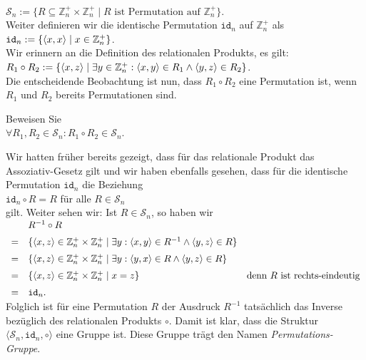 \\[0.2cm]
\hspace*{1.3cm}
$\mathcal{S}_n := \{ R \subseteq \mathbb{Z}_n^+ \times \mathbb{Z}_n^+ \mid \mbox{$R$ ist Permutation auf $\mathbb{Z}_n^+$} \}$.
\\[0.2cm]
Weiter definieren wir die identische Permutation $\mathtt{id}_n$ auf $\mathbb{Z}_n^+$ als
\\[0.2cm]
\hspace*{1.3cm}
$\mathtt{id}_n := \{ \pair(x,x) \mid x \in \mathbb{Z}_n^+ \}$.
\\[0.2cm]
Wir erinnern an die Definition des relationalen Produkts, es gilt:
\\[0.2cm]
\hspace*{1.3cm}
$R_1 \circ R_2 := \{ \pair(x,z) \mid \exists y \in \mathbb{Z}_n^+: \pair(x,y) \in R_1 \wedge \pair(y,z) \in R_2 \}$.
\\[0.2cm]
Die entscheidende Beobachtung ist nun, dass $R_1 \circ R_2$ eine Permutation ist, wenn $R_1$ und $R_2$
bereits Permutationen sind.

\exercise
Beweisen Sie
\\[0.2cm]
\hspace*{1.3cm}
$\forall R_1, R_2 \in \mathcal{S}_n: R_1 \circ R_2 \in \mathcal{S}_n$.
\exend


\remark
Wir hatten fr\"{u}her bereits gezeigt, dass f\"{u}r das relationale Produkt das Assoziativ-Gesetz gilt und wir
haben ebenfalls gesehen, dass f\"{u}r die identische Permutation $\mathtt{id}_n$ die Beziehung
\\[0.2cm]
\hspace*{1.3cm}
$\mathtt{id}_n \circ R = R$ \quad f\"{u}r alle $R \in \mathcal{S}_n$
\\[0.2cm]
gilt.  Weiter sehen wir: Ist $R \in \mathcal{S}_n$, so haben wir
\\[0.2cm]
\hspace*{1.3cm}
$
\begin{array}[t]{cll}
   & R^{-1} \circ R \\[0.2cm]
 = & \{ \pair(x,z) \in \mathbb{Z}_n^+\times \mathbb{Z}_n^+ \mid \exists y: 
        \pair(x,y) \in R^{-1} \wedge \pair(y,z) \in R 
     \} \\[0.2cm]
 = & \{ \pair(x,z) \in \mathbb{Z}_n^+ \times \mathbb{Z}_n^+ \mid 
        \exists y: \pair(y,x) \in R \wedge \pair(y,z) \in R 
     \} 
   & \\[0.2cm]
 = & \{ \pair(x,z) \in \mathbb{Z}_n^+ \times \mathbb{Z}_n^+ \mid x = z \}
    & \mbox{denn $R$ ist rechts-eindeutig}    \\[0.2cm]
 = & \mathtt{id}_n.
\end{array}
$
\\[0.2cm]
Folglich ist f\"{u}r eine Permutation $R$ der Ausdruck $R^{-1}$ tats\"{a}chlich das Inverse bez\"{u}glich des
relationalen Produkts $\circ$.  Damit ist klar, dass die 
Struktur $\langle \mathcal{S}_n, \mathtt{id}_n, \circ \rangle$ eine Gruppe ist.
Diese Gruppe tr\"{a}gt den Namen \emph{Permutations-Gruppe}.
\eox

